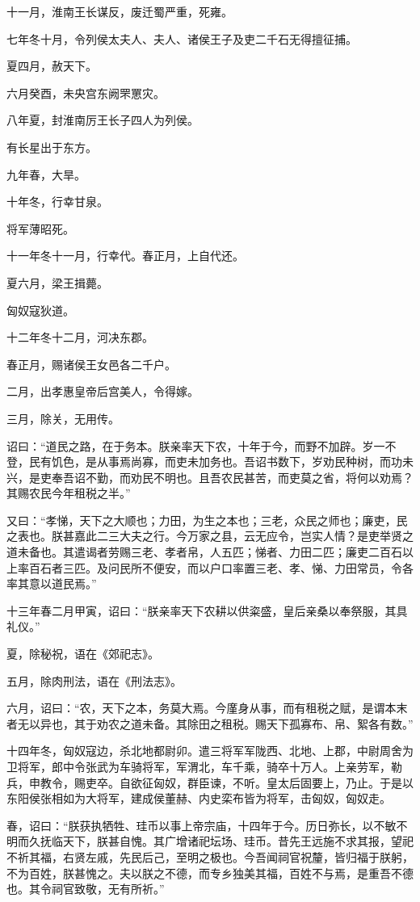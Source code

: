 \documentclass[]{article}
\begin{document}
十一月，淮南王长谋反，废迁蜀严重，死雍。

七年冬十月，令列侯太夫人、夫人、诸侯王子及吏二千石无得擅征捕。

夏四月，赦天下。

六月癸酉，未央宫东阙罘罳灾。

八年夏，封淮南厉王长子四人为列侯。

有长星出于东方。

九年春，大旱。

十年冬，行幸甘泉。

将军薄昭死。

十一年冬十一月，行幸代。春正月，上自代还。

夏六月，梁王揖薨。

匈奴寇狄道。

十二年冬十二月，河决东郡。

春正月，赐诸侯王女邑各二千户。

二月，出孝惠皇帝后宫美人，令得嫁。

三月，除关，无用传。

诏曰：``道民之路，在于务本。朕亲率天下农，十年于今，而野不加辟。岁一不登，民有饥色，是从事焉尚寡，而吏未加务也。吾诏书数下，岁劝民种树，而功未兴，是吏奉吾诏不勤，而劝民不明也。且吾农民甚苦，而吏莫之省，将何以劝焉？其赐农民今年租税之半。''

又曰：``孝悌，天下之大顺也；力田，为生之本也；三老，众民之师也；廉吏，民之表也。朕甚嘉此二三大夫之行。今万家之县，云无应令，岂实人情？是吏举贤之道未备也。其遣谒者劳赐三老、孝者帛，人五匹；悌者、力田二匹；廉吏二百石以上率百石者三匹。及问民所不便安，而以户口率置三老、孝、悌、力田常员，令各率其意以道民焉。''

十三年春二月甲寅，诏曰：``朕亲率天下农耕以供粢盛，皇后亲桑以奉祭服，其具礼仪。''

夏，除秘祝，语在《郊祀志》。

五月，除肉刑法，语在《刑法志》。

六月，诏曰：``农，天下之本，务莫大焉。今廑身从事，而有租税之赋，是谓本末者无以异也，其于劝农之道未备。其除田之租税。赐天下孤寡布、帛、絮各有数。''

十四年冬，匈奴寇边，杀北地都尉卯。遣三将军军陇西、北地、上郡，中尉周舍为卫将军，郎中令张武为车骑将军，军渭北，车千乘，骑卒十万人。上亲劳军，勒兵，申教令，赐吏卒。自欲征匈奴，群臣谏，不听。皇太后固要上，乃止。于是以东阳侯张相如为大将军，建成侯董赫、内史栾布皆为将军，击匈奴，匈奴走。

春，诏曰：``朕获执牺牲、珪币以事上帝宗庙，十四年于今。历日弥长，以不敏不明而久抚临天下，朕甚自愧。其广增诸祀坛场、珪币。昔先王远施不求其报，望祀不祈其福，右贤左戚，先民后己，至明之极也。今吾闻祠官祝釐，皆归福于朕躬，不为百姓，朕甚愧之。夫以朕之不德，而专乡独美其福，百姓不与焉，是重吾不德也。其令祠官致敬，无有所祈。''
\end{document}
